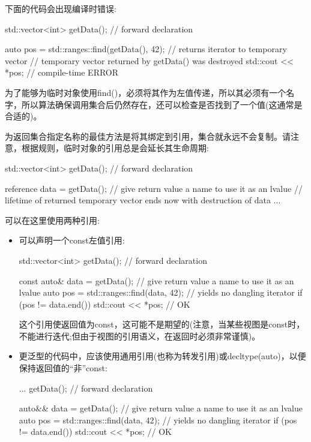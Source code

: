 下面的代码会出现编译时错误:

\begin{cpp}
std::vector<int> getData(); // forward declaration

auto pos = std::ranges::find(getData(), 42); // returns iterator to temporary vector
// temporary vector returned by getData() was destroyed
std::cout << *pos; // compile-time ERROR
\end{cpp}

为了能够为临时对象使用find()，必须将其作为左值传递，所以其必须有一个名字，所以算法确保调用集合后仍然存在，还可以检查是否找到了一个值(这通常是合适的)。

为返回集合指定名称的最佳方法是将其绑定到引用，集合就永远不会复制。请注意，根据规则，临时对象的引用总是会延长其生命周期:

\begin{cpp}
std::vector<int> getData(); // forward declaration

reference data = getData(); // give return value a name to use it as an lvalue
// lifetime of returned temporary vector ends now with destruction of data
...
\end{cpp}

可以在这里使用两种引用:

\begin{itemize}
\item
可以声明一个const左值引用:

\begin{cpp}
std::vector<int> getData(); // forward declaration

const auto& data = getData(); // give return value a name to use it as an lvalue
auto pos = std::ranges::find(data, 42); // yields no dangling iterator
if (pos != data.end()) {
	std::cout << *pos; // OK
}
\end{cpp}

这个引用使返回值为const，这可能不是期望的(注意，当某些视图是const时，不能进行迭代;但由于视图的引用语义，在返回时必须非常谨慎)。

\item
更泛型的代码中，应该使用通用引用(也称为转发引用)或decltype(auto)，以便保持返回值的“非”const:

\begin{cpp}
... getData(); // forward declaration

auto&& data = getData(); // give return value a name to use it as an lvalue
auto pos = std::ranges::find(data, 42); // yields no dangling iterator
if (pos != data.end()) {
	std::cout << *pos; // OK
}
\end{cpp}
\end{itemize}


